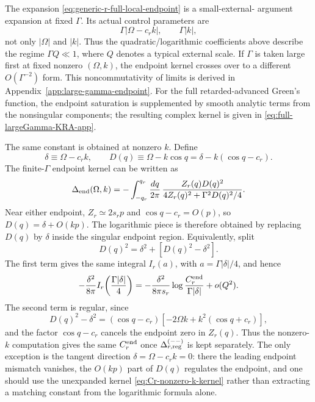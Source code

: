 \documentclass[aps,prx,preprint,amsmath,amssymb]{revtex4-2}
\begin{document}
The expansion \eqref{eq:generic-r-full-local-endpoint} is a small-external-
argument expansion at fixed \(\Gamma\).  Its actual control parameters are
\[
\Gamma|\Omega-c_r k|,
\qquad
\Gamma|k|,
\]
not only \(|\Omega|\) and \(|k|\).  Thus the quadratic/logarithmic coefficients
above describe the regime \(\Gamma Q\ll1\), where \(Q\) denotes a typical
external scale.  If \(\Gamma\) is taken large first at fixed nonzero
\((\Omega,k)\), the endpoint kernel crosses over to a different
\(O(\Gamma^{-2})\) form.  This noncommutativity of limits is derived in
Appendix~\ref{app:large-gamma-endpoint}.  For the full retarded-advanced
Green's function, the endpoint saturation is supplemented by smooth analytic
terms from the nonsingular components; the resulting complex kernel is given in
\eqref{eq:full-largeGamma-KRA-app}.

The same constant is obtained at nonzero \(k\).  Define
\begin{equation}
\delta\equiv \Omega-c_r k,
\qquad
D(q)\equiv \Omega-k\cos q
=\delta-k(\cos q-c_r).
\end{equation}
The finite-\(\Gamma\) endpoint kernel can be written as
\begin{equation}
\label{eq:Cr-nonzero-k-kernel}
\Delta_{\rm end}(\Omega,k)
=
-\int_{-q_r}^{q_r}\frac{dq}{2\pi}\,
\frac{Z_r(q)D(q)^2}
{4Z_r(q)^2+\Gamma^2D(q)^2/4}.
\end{equation}
Near either endpoint, \(Z_r\simeq2s_rp\) and
\(\cos q-c_r=O(p)\), so \(D(q)=\delta+O(kp)\).  The logarithmic piece is
therefore obtained by replacing \(D(q)\) by \(\delta\) inside the singular
endpoint region.  Equivalently, split
\[
D(q)^2=\delta^2+\left[D(q)^2-\delta^2\right].
\]
The first term gives the same integral \(I_r(a)\), with
\(a=\Gamma|\delta|/4\), and hence
\begin{equation}
-\frac{\delta^2}{8\pi}I_r\!\left(\frac{\Gamma|\delta|}{4}\right)
=
-\frac{\delta^2}{8\pi s_r}
\log\frac{C_r^{\rm end}}{\Gamma|\delta|}
+o(Q^2).
\end{equation}
The second term is regular, since
\begin{equation}
D(q)^2-\delta^2
=
(\cos q-c_r)\left[-2\Omega k+k^2(\cos q+c_r)\right],
\end{equation}
and the factor \(\cos q-c_r\) cancels the endpoint zero in \(Z_r(q)\).  Thus
the nonzero-\(k\) computation gives the same \(C_r^{\rm end}\) once
\(\Delta_{r,\rm reg}^{(--)}\) is kept separately.  The only exception is the
tangent direction \(\delta=\Omega-c_rk=0\): there the leading endpoint mismatch
vanishes, the \(O(kp)\) part of \(D(q)\) regulates the endpoint, and one should
use the unexpanded kernel \eqref{eq:Cr-nonzero-k-kernel} rather than extracting
a matching constant from the logarithmic formula alone.
\end{document}
